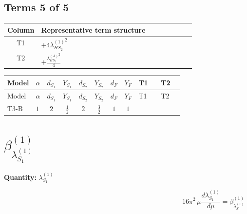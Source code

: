 \documentclass[8pt]{article}
\begin{document}
\begin{landscape}
\subsection*{Terms 5 of 5}
\begin{center}
\begin{tabular}{@{}c >{\raggedright\arraybackslash}p{0.82\linewidth}@{}}
\toprule
Column & Representative term structure \\
\midrule
T1 & \(\displaystyle +4 {\lambda_{HS_2}^{(1)}}^2\) \\
\midrule
T2 & \(\displaystyle +\frac{{\lambda_{HS_2}^{(A)}}^2}{4}\) \\
\midrule
\bottomrule
\end{tabular}
\end{center}
\smallskip
\tiny
\begin{longtable}{@{}llcccccc >{\raggedright\arraybackslash}p{0.21\linewidth} >{\raggedright\arraybackslash}p{0.21\linewidth}@{}}
\toprule
Model & $\alpha$ & $d_{S_1}$ & $Y_{S_1}$ & $d_{S_2}$ & $Y_{S_2}$ & $d_F$ & $Y_F$ & T1 & T2 \\
\midrule
\endfirsthead
\toprule
Model & $\alpha$ & $d_{S_1}$ & $Y_{S_1}$ & $d_{S_2}$ & $Y_{S_2}$ & $d_F$ & $Y_F$ & T1 & T2 \\
\midrule
\endhead
T3-B & $1$ & $2$ & $\frac{1}{2}$ & $2$ & $\frac{3}{2}$ & $1$ & $1$ & \scriptsize\adjustbox{max width=\linewidth}{$\begin{gathered} +4 {\lambda_{HS_2}^{(1)}}^2\end{gathered}$} & \scriptsize\adjustbox{max width=\linewidth}{$\begin{gathered} +\frac{{\lambda_{HS_2}^{(A)}}^2}{4}\end{gathered}$} \\
\midrule
\bottomrule
\end{longtable}
\clearpage
\section*{$\beta_{\lambda_{S_1}^{(1)}}^{(1)}$}
\noindent\textbf{Quantity: }$\lambda_{S_1}^{(1)}$\par\smallskip
\[16\pi^2\,\mu\frac{d \lambda_{S_1}^{(1)}}{d\mu}=\beta_{\lambda_{S_1}^{(1)}}^{(1)}\]

\end{landscape}
\end{document}
